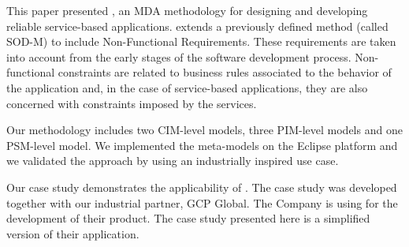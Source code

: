 This paper presented \pisodm, an MDA methodology for designing and developing reliable service-based applications. 
\pisodm extends a previously defined method (called SOD-M) to include Non-Functional Requirements.
These requirements are taken into account from the early stages of the software development process.
Non-functional constraints are related to business rules associated to the behavior of the application and, in the case of service-based applications, they are also concerned with constraints imposed by the services. 

Our methodology includes two CIM-level models, three PIM-level models and one PSM-level model. 
We implemented the meta-models on the Eclipse platform and we validated the approach by using an industrially inspired use case.

Our case study demonstrates the applicability of \pisodm.
The case study was developed together with our industrial partner, GCP Global.
The Company is using \pisodm for the development of their product.
The case study presented here is a simplified version of their application.